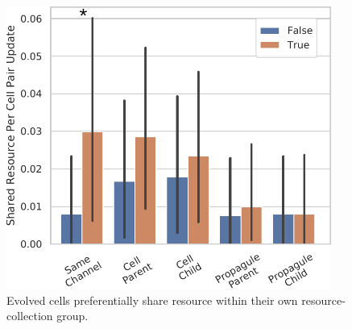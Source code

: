 \begin{figure}
  \begin{columns}
  \begin{column}{0.75\textwidth}
  \includegraphics[width=\textwidth]{img/channelsense-yes__nlev-two+title=resource_contributed+ext=}
  \end{column}
  \begin{column}{0.25\textwidth}
  \caption{
  Evolved cells preferentially share resource within their own resource-collection group.
  }
  \label{fig:sharing}
  \end{column}
  \end{columns}
\end{figure}
